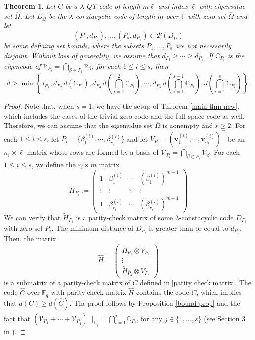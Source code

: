 \documentclass[11pt]{amsart}
\theoremstyle{plain}
\newtheorem{thm}{Theorem}[section]
\theoremstyle{definition}
\numberwithin{equation}{section}
\newcommand{\Fq}{\mathbb{F}_{q}}
\newcommand{\F}{{\mathbb F}}
\begin{document}
\begin{thm}\label{ISB}
Let $C$ be a $\lambda$-QT code of length $m\ell$ and index $\ell$ with eigenvalue set $\overline{\Omega}$. Let $D_{\overline{\Omega}}$ be the $\lambda$-constacyclic code of length $m$ over $\F$ with zero set $\overline{\Omega}$ and let
\[
(P_1,d_{P_1}),\ldots,(P_s,d_{P_s})\in \mathcal{B}(D_{\overline{\Omega}})
\]
be some defining set bounds, where the subsets $P_1,\ldots,P_s$ are not necessarily disjoint. Without loss of generality, we assume that $d_{P_1}\geq \cdots \geq d_{P_s}$. If $\mathbb{C}_{P_i}$ is the eigencode of $\mathcal{V}_{P_i}=\bigcap_{\beta\in P_i}\mathcal{V}_{\beta}$, for each $1\leq i\leq s$, then
\begin{equation}\label{NewSpec}
d\geq \min \left\{d_{P_1},d_{P_2} \, d(\mathbb{C}_{P_1}), d_{P_3} \, d\left(\bigcap_{i=1}^2\mathbb{C}_{P_i}\right), \cdots, d_{P_s} \, d\left(\bigcap_{i=1}^{s-1}\mathbb{C}_{P_i}\right), d\left(\bigcap_{i=1}^s\mathbb{C}_{P_i}\right)\right\}.
\end{equation}
\end{thm}

\begin{proof}
Note that, when $s=1$, we have the setup of Theorem \ref{main thm new}, which includes the cases of the trivial zero code and the full space code as well. Therefore, we can assume that the eigenvalue set $\overline{\Omega}$ is nonempty and $s\geq 2$.
For each $1\leq i\leq s$, let $P_i=\{\beta_1^{(i)},\cdots,\beta_{r_i}^{(i)}\}$ and let $V_{P_i}=\left(\mathbf{v}_1^{(i)},\cdots,\mathbf{v}_{n_i}^{(i)}\right)^{\top}$ be an $n_i\times \ell$ matrix whose rows are formed by a basis of $\mathcal{V}_{P_i}=\bigcap_{\beta\in P_i}\mathcal{V}_{\beta}$. For each $1\leq i\leq s$, we define the $r_i \times m$ matrix
\[
\widetilde{H}_{P_i}:=\begin{pmatrix}
1&  \beta_1^{(i)} & \cdots& \left(\beta_1^{(i)}\right)^{m-1}\\
\vdots& \vdots &  \ddots & \vdots\\
1&  \beta_{r_i}^{(i)} & \cdots& \left(\beta_{r_i}^{(i)}\right)^{m-1}
\end{pmatrix}
\]
We can verify that $\widetilde{H}_{P_i}$ is a parity-check matrix of some $\lambda$-constacyclic code $D_{P_i}$ with zero set $P_i$. The minimum distance of $D_{P_i}$ is greater than or equal to $d_{P_i}$. Then, the matrix
\[
\widehat{H}=\begin{pmatrix}
\widetilde{H}_{P_1}\otimes V_{P_1}\\
\vdots\\
\widetilde{H}_{P_s}\otimes V_{P_s}
\end{pmatrix}
\]
is a submatrix of a parity-check matrix of $C$ defined in \eqref{parity check matrix}. The code $\widehat{C}$ over $\F_q$ with parity-check matrix $\widehat{H}$ contains the code $C$, which implies that $d(C)\geq d(\widehat{C})$. The proof follows by Proposition \ref{bound prop} and the fact that $\left(\mathcal{V}_{P_1}+\cdots+\mathcal{V}_{P_j}\right)^\perp\bigr\rvert_{\Fq}=\bigcap_{i=1}^j\mathbb{C}_{P_i}$, for any $j\in\{1,\ldots,s\}$ (see Section 3 in \cite{ELLOT}).
\end{proof}
\end{document}
